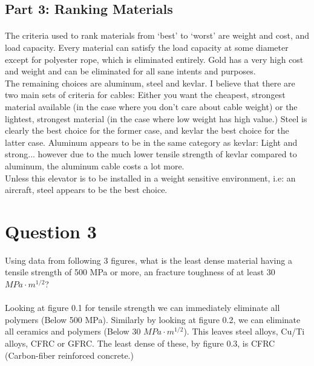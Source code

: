 \documentclass[paper=a4, fontsize=12pt]{scrartcl} %
\numberwithin{equation}{section} %
\numberwithin{figure}{section} %
\numberwithin{table}{section} %
\begin{document}
\subsection*{Part 3: Ranking Materials}
\paragraph{} The criteria used to rank materials from `best' to `worst' are weight and cost, and load capacity. Every material can satisfy the load capacity at some diameter except for polyester rope, which is eliminated entirely. Gold has a very high cost and weight and can be eliminated for all sane intents and purposes. \\
The remaining choices are aluminum, steel and kevlar. I believe that there are two main sets of criteria for cables: Either you want the cheapest, strongest material available (in the case where you don't care about cable weight) or the lightest, strongest material (in the case where low weight has high value.) Steel is clearly the best choice for the former case, and kevlar the best choice for the latter case. Aluminum appears to be in the same category as kevlar: Light and strong... however due to the much lower tensile strength of kevlar compared to aluminum, the aluminum cable costs a lot more. \\
Unless this elevator is to be installed in a weight sensitive environment, i.e: an aircraft, steel appears to be the best choice. 

\newpage


\section*{Question 3}

Using data from following 3 figures, what is the least dense material having a tensile strength of 500 MPa or more, an fracture toughness of at least 30 $MPa\cdot m^{1/2}$? \\

\paragraph{} Looking at figure 0.1 for tensile strength we can immediately eliminate all polymers (Below 500 MPa). Similarly by looking at figure 0.2, we can eliminate all ceramics and polymers (Below 30 $MPa\cdot m^{1/2}$). This leaves steel alloys, Cu/Ti alloys, CFRC or GFRC. The least dense of these, by figure 0.3, is CFRC (Carbon-fiber reinforced concrete.)
\end{document}
